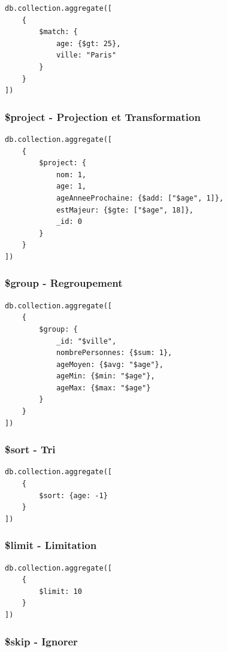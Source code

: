 \documentclass[11pt,a4paper]{article}
\begin{document}
\begin{lstlisting}
db.collection.aggregate([
    {
        $match: {
            age: {$gt: 25},
            ville: "Paris"
        }
    }
])
\end{lstlisting}

\subsubsection{\$project - Projection et Transformation}

\begin{lstlisting}
db.collection.aggregate([
    {
        $project: {
            nom: 1,
            age: 1,
            ageAnneeProchaine: {$add: ["$age", 1]},
            estMajeur: {$gte: ["$age", 18]},
            _id: 0
        }
    }
])
\end{lstlisting}

\subsubsection{\$group - Regroupement}

\begin{lstlisting}
db.collection.aggregate([
    {
        $group: {
            _id: "$ville",
            nombrePersonnes: {$sum: 1},
            ageMoyen: {$avg: "$age"},
            ageMin: {$min: "$age"},
            ageMax: {$max: "$age"}
        }
    }
])
\end{lstlisting}

\subsubsection{\$sort - Tri}

\begin{lstlisting}
db.collection.aggregate([
    {
        $sort: {age: -1}
    }
])
\end{lstlisting}

\subsubsection{\$limit - Limitation}

\begin{lstlisting}
db.collection.aggregate([
    {
        $limit: 10
    }
])
\end{lstlisting}

\subsubsection{\$skip - Ignorer}
\end{document}
